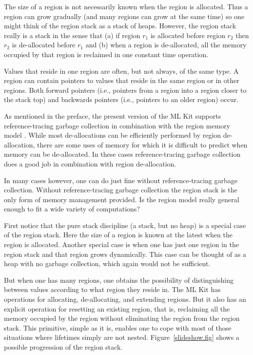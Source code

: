 \documentclass[12pt]{book}
\begin{document}
The size of a region 
%
is not necessarily known when the region is allocated.  Thus a region
can grow gradually (and many regions can grow at the same time) so one
might think of the region stack as a stack of heaps. However, the
region stack really is a stack in the sense that (a) if region $r_1$
is allocated before region $r_2$ then $r_2$ is de-allocated before
$r_1$ and (b) when a region is de-allocated, all the memory occupied
by that region is reclaimed in one constant time operation.

Values that reside in one region are often, but not always, of the
same type. A region can contain pointers to values that reside in the
same region or in other regions. Both forward pointers (i.e., pointers
from a region into a region closer to the stack top) and backwards
pointers (i.e., pointers to an older region) occur.

As mentioned in the preface, the present version of the ML Kit
supports reference-tracing 
%
garbage collection in combination with the region memory model
\cite{hallenberg99}. While most de-allocations can be efficiently
performed by region de-allocation, there are some uses of memory for
which it is difficult to predict when memory can be de-allocated.  In
these cases reference-tracing garbage collection does a good job in
combination with region de-allocation.

In many cases however, one can do just fine without reference-tracing
garbage collection. Without reference-tracing garbage collection the
region stack is the only form of memory management provided. Is the
region model really general enough to fit a wide variety of
computations?

First notice that the pure 
%
stack discipline (a stack, but no heap) is a special case of the
region stack. Here the size of a region is known at the latest when
the region is allocated. Another special case is when one has just one
region in the region stack and that region grows dynamically.  This
case can be thought of as a 
%
heap with no garbage collection, which again would not be sufficient.

But when one has many regions, one obtains the possibility of
distinguishing between values according to what region they reside in.
The ML Kit has operations for allocating, de-allocating, and extending
regions. But it also has an explicit operation for
%
resetting an existing region, that is, reclaiming all the memory
occupied by the region without eliminating the region from the region
stack.  This primitive, simple as it is, enables one to cope with most
of those situations where lifetimes simply are not nested.
Figure~\ref{slideshow.fig} shows a possible progression of the region
stack.
\end{document}
